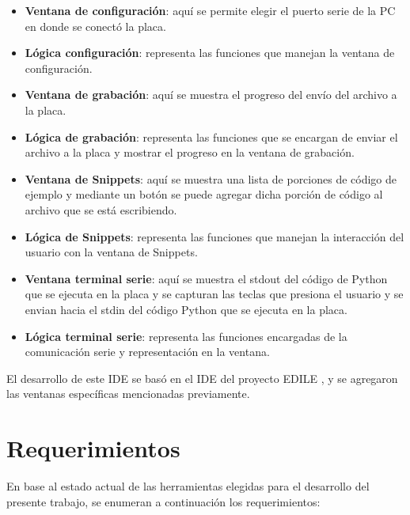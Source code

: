 \begin{itemize}
	\item \textbf{Ventana de configuración}: aquí se permite elegir el puerto serie de la PC en donde se conectó la placa.
	\item \textbf{Lógica configuración}: representa las funciones que manejan la ventana de configuración.
	\item \textbf{Ventana de grabación}: aquí se muestra el progreso del envío del archivo a la placa.
	\item \textbf{Lógica de grabación}: representa las funciones que se encargan de enviar el archivo a la placa y mostrar el progreso en la ventana de grabación.
	\item \textbf{Ventana de Snippets}: aquí se muestra una lista de porciones de código de ejemplo y mediante un botón se puede agregar dicha porción de código al archivo que se está escribiendo.
	\item \textbf{Lógica de Snippets}: representa las funciones que manejan la interacción del usuario con la ventana de Snippets.
	\item \textbf{Ventana terminal serie}: aquí se muestra el stdout del código de Python que se ejecuta en la placa y se capturan las teclas que presiona el usuario y se envian hacia el stdin del código Python que se ejecuta en la placa.
	\item \textbf{Lógica terminal serie}: representa las funciones encargadas de la comunicación serie y representación en la ventana.
\end{itemize}
	
El desarrollo de este IDE se basó en el IDE del proyecto EDILE \cite{edile}, y se agregaron las ventanas específicas mencionadas previamente.







\section{Requerimientos}
\label{sec:req}

En base al estado actual de las herramientas elegidas para el desarrollo del presente trabajo, se enumeran a continuación los requerimientos:

